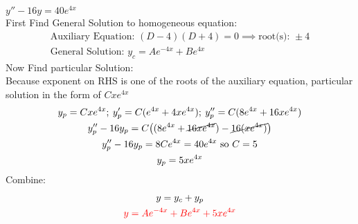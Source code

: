 \item [8.] $y''-16y=40e^{4x}$\\[2mm]
First Find General Solution to homogeneous equation:
\begin{gather*}
    \text{Auxiliary Equation: } (D-4)(D+4)=0 \implies \text{root(s): } \pm 4\\
    \text{General Solution: } y_c=Ae^{-4x}+Be^{4x}
\end{gather*}
Now Find particular Solution:\\
Because exponent on RHS is one of the roots of the auxiliary equation, particular solution in the form of $Cxe^{4x}$
\begin{gather*}
    y_p=Cxe^{4x};\:y_p'=C(e^{4x}+4xe^{4x});\:y_p''=C(8e^{4x}+16xe^{4x})\\
    y_p''-16y_p=C\big((8e^{4x}+\cancel{16xe^{4x}})-\cancel{16(xe^{4x})}\big)\\
    y_p''-16y_p=8Ce^{4x} = 40e^{4x} \text{ so } C=5\\
    y_p = 5xe^{4x}
\end{gather*}
Combine:
\begin{gather*}
    y=y_c+y_p\\
    \textcolor{red}{y = Ae^{-4x}+Be^{4x}+5xe^{4x}}
\end{gather*}